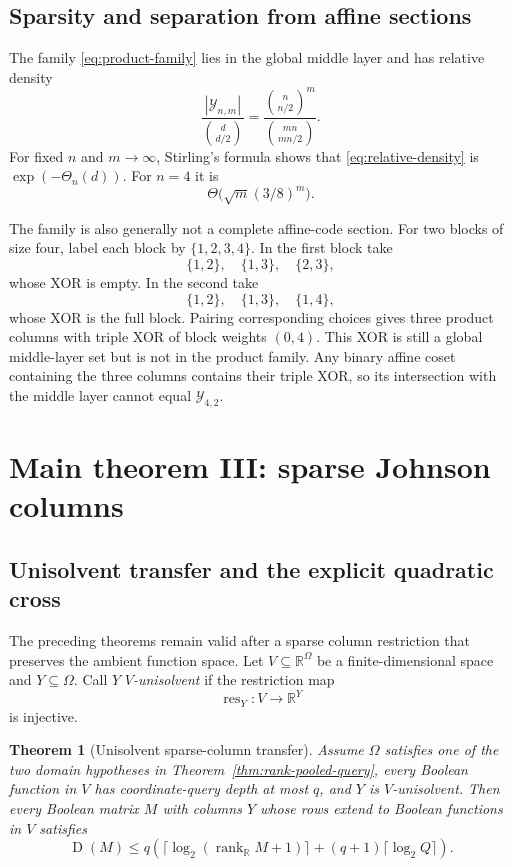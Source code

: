 \documentclass[11pt]{article}
\newtheorem{theorem}{Theorem}[section]
\theoremstyle{definition}
\theoremstyle{remark}
\newcommand{\cY}{\mathcal Y}
\newcommand{\R}{\mathbb R}
\newcommand{\1}{\mathbf 1}
\newcommand{\rank}{\operatorname{rank}}
\newcommand{\Dcc}{\operatorname{D}}
\begin{document}
\subsection{Sparsity and separation from affine sections}

The family \eqref{eq:product-family} lies in the global middle layer and has
relative density
\begin{equation}\label{eq:relative-density}
 \frac{|\cY_{n,m}|}{\binom d{d/2}}
 =\frac{\binom n{n/2}^m}{\binom{mn}{mn/2}}.
\end{equation}
For fixed $n$ and $m\to\infty$, Stirling's formula shows that
\eqref{eq:relative-density} is $\exp(-\Theta_n(d))$.  For $n=4$ it is
\[
 \Theta\bigl(\sqrt m(3/8)^m\bigr).
\]

The family is also generally not a complete affine-code section.  For two
blocks of size four, label each block by $\{1,2,3,4\}$.  In the first block
take
\[
 \{1,2\},\quad\{1,3\},\quad\{2,3\},
\]
whose XOR is empty.  In the second take
\[
 \{1,2\},\quad\{1,3\},\quad\{1,4\},
\]
whose XOR is the full block.  Pairing corresponding choices gives three
product columns with triple XOR of block weights $(0,4)$.  This XOR is still
a global middle-layer set but is not in the product family.  Any binary
affine coset containing the three columns contains their triple XOR, so its
intersection with the middle layer cannot equal $\cY_{4,2}$.

\section{Main theorem III: sparse Johnson columns}

\subsection{Unisolvent transfer and the explicit quadratic cross}

The preceding theorems remain valid after a sparse column restriction that
preserves the ambient function space.  Let $V\subseteq\R^\Omega$ be a
finite-dimensional space and $Y\subseteq\Omega$.  Call $Y$
\emph{$V$-unisolvent} if the restriction map
\[
 \operatorname{res}_Y:V\longrightarrow\R^Y
\]
is injective.

\begin{theorem}[Unisolvent sparse-column transfer]
\label{thm:unisolvent-transfer}
Assume $\Omega$ satisfies one of the two domain hypotheses in
Theorem~\ref{thm:rank-pooled-query}, every Boolean function in $V$ has
coordinate-query depth at most $q$, and $Y$ is $V$-unisolvent.  Then every
Boolean matrix $M$ with columns $Y$ whose rows extend to Boolean functions in
$V$ satisfies
\[
 \Dcc(M)\le
 q\left(\lceil\log_2(\rank_{\R}M+1)\rceil+
 (q+1)\lceil\log_2Q\rceil\right).
\]
\end{theorem}
\end{document}
